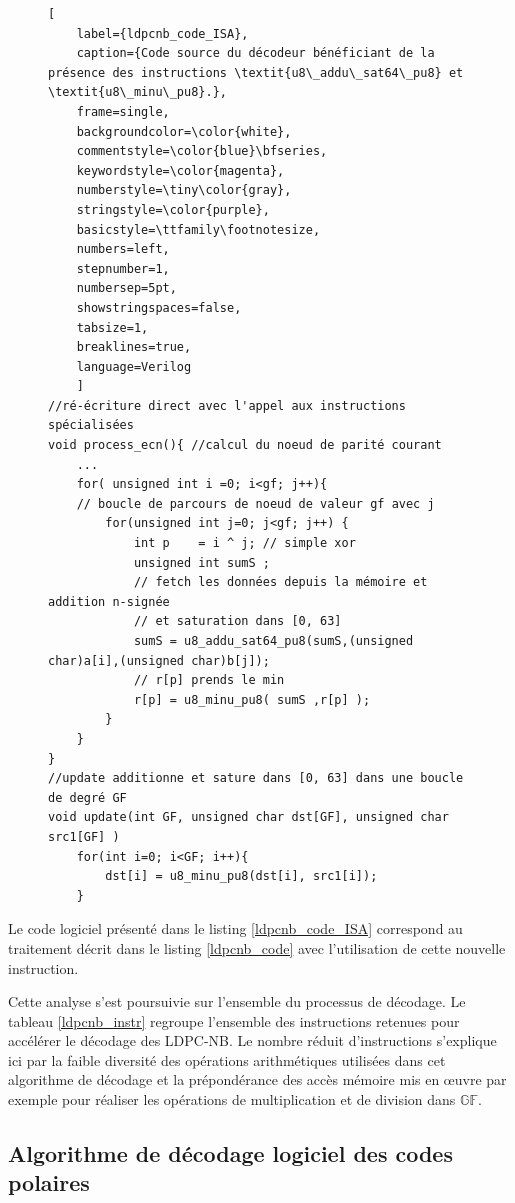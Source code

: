 \documentclass[../main.tex]{subfiles}
\begin{document}
\begin{figure}[!tb]
\begin{lstlisting}[
    label={ldpcnb_code_ISA},
    caption={Code source du décodeur bénéficiant de la présence des instructions \textit{u8\_addu\_sat64\_pu8} et \textit{u8\_minu\_pu8}.},
    frame=single,
    backgroundcolor=\color{white},  
    commentstyle=\color{blue}\bfseries,
    keywordstyle=\color{magenta},
    numberstyle=\tiny\color{gray},
    stringstyle=\color{purple},
    basicstyle=\ttfamily\footnotesize,
    numbers=left,
    stepnumber=1,
    numbersep=5pt,                 
    showstringspaces=false,
    tabsize=1,
    breaklines=true,
    language=Verilog
    ]
//ré-écriture direct avec l'appel aux instructions spécialisées 
void process_ecn(){ //calcul du noeud de parité courant 
    ...
    for( unsigned int i =0; i<gf; j++){
    // boucle de parcours de noeud de valeur gf avec j 
        for(unsigned int j=0; j<gf; j++) {
            int p    = i ^ j; // simple xor 
            unsigned int sumS ; 
            // fetch les données depuis la mémoire et addition n-signée
            // et saturation dans [0, 63] 
            sumS = u8_addu_sat64_pu8(sumS,(unsigned char)a[i],(unsigned char)b[j]);
            // r[p] prends le min
            r[p] = u8_minu_pu8( sumS ,r[p] );
        }
    }
}
//update additionne et sature dans [0, 63] dans une boucle de degré GF 
void update(int GF, unsigned char dst[GF], unsigned char src1[GF] )
    for(int i=0; i<GF; i++){
        dst[i] = u8_minu_pu8(dst[i], src1[i]);
    }
\end{lstlisting}
\end{figure}

Le code logiciel présenté dans le listing \ref{ldpcnb_code_ISA} correspond au traitement décrit dans le listing \ref{ldpcnb_code} avec l'utilisation de cette nouvelle instruction.

Cette analyse s'est poursuivie sur l'ensemble du processus de décodage. Le tableau \ref{ldpcnb_instr} regroupe l'ensemble des instructions retenues pour accélérer le décodage des LDPC-NB. Le nombre réduit d'instructions s'explique ici par la faible diversité des opérations arithmétiques utilisées dans cet algorithme de décodage et la prépondérance des accès mémoire mis en œuvre par exemple pour réaliser les opérations de multiplication et de division dans $\mathbb{GF}$.

%
\subsection{Algorithme de décodage logiciel des codes polaires}
%
%
%
%
\end{document}
